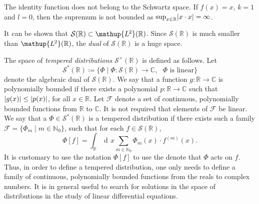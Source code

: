 \documentclass[12pt, a4 paper]{article}
\theoremstyle{definition}
\newcommand{\ltwo}{\mathup{L\kern-0.5pt^2}}
\newcommand{\rr}{\mathbb{R}}
\newcommand{\cc}{\mathbb{C}}
\newcommand{\nn}{\mathbb{N}_0}
\newcommand{\ltwor}{\ltwo(\rr)}
\newcommand{\schwartz}{\mathcal{S}}
\newcommand{\schwartzr}{\schwartz(\rr)}
\newcommand{\dist}{\schwartz^\times}
\newcommand{\distr}{\dist(\rr)}
\newcommand{\distar}{\schwartz^*(\rr)}
\newcommand{\family}{\mathcal{F}}
\DeclarePairedDelimiter{\abs}{\lvert}{\rvert}
\newcommand{\der}{\operatorname{d\!}{}}
\begin{document}
	The identity function does not belong to the Schwartz space. If $f(x) = x$, $k=1$ and $l=0$, then the supremum is not bounded as $\sup_{x \in \rr} \abs{x \cdot x} = \infty$.

	It can be shown that $\schwartzr \subset \ltwor$. Since $\schwartzr$ is much smaller than $\ltwor$, the \textit{dual} of $\schwartzr$ is a huge space.

	The space of \textit{tempered distributions} $\distr$ is defined as follows. Let
	\[
	\distar \coloneq \{\Phi \mid \Phi \colon \schwartzr \rightarrow \cc, \text{ $\Phi$ is linear}\}
	\] denote the algebraic dual of $\schwartzr$.  We say that a function $g \colon \rr \rightarrow \cc$ is polynomially bounded if there exists a polynomial $p \colon \rr \rightarrow \cc$ such that $\abs{g(x)} \leq \abs{p(x)}$, for all $x\in \rr$. Let $\family$ denote a set of continuous, polynomially bounded functions from $\rr$ to $\cc$. It is not required that elements of $\family$ be linear. We say that a $\Phi \in \distar$ is a tempered distribution if there exists such a family $\family = \{\Phi_m \mid m \in \nn\}$, such that for each $f\in \schwartzr$,
	\[
	\Phi[f] = \int_{\rr} \der x \sum_{m \in \nn} \Phi_m (x) \cdot f^{(m)} (x).
	\]
	It is customary to use the notation $\Phi[f]$ to use the denote that $\Phi$ acts on $f$. Thus, in order to define a tempered distribution, one only needs to define a family of  continuous, polynomially bounded functions from the reals to complex numbers. It is in general useful to search for solutions in the space of distributions in the study of linear differential equations.

\end{document}
